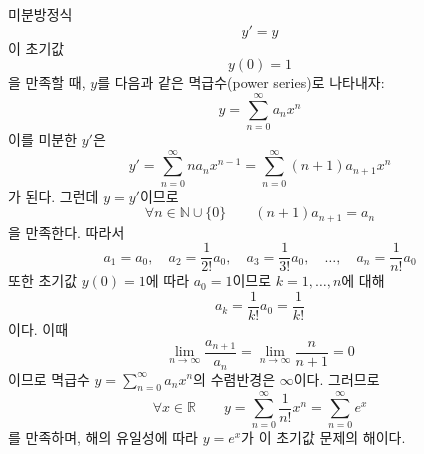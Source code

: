 \documentclass[../engineering_mathematics_lecture_note.tex]{subfiles}
\begin{document}
\begin{example}
    미분방정식
    \begin{equation*}
        y' = y
    \end{equation*}
    이 초기값
    \begin{equation*}
        y(0) = 1
    \end{equation*}
    을 만족할 때, $y$를 다음과 같은 멱급수(power series)로 나타내자:
    \begin{equation*}
        y = \sum_{n = 0}^\infty a_n x^n
    \end{equation*}
    이를 미분한 $y'$은
    \begin{equation*}
        y' = \sum_{n = 0}^\infty n a_n x^{n - 1} = \sum_{n = 0}^\infty (n + 1) a_{n + 1} x^n
    \end{equation*}
    가 된다.
    그런데 $y = y'$이므로
    \begin{equation*}
        \forall n \in \mathbb N \cup \{0\} \qquad (n + 1) a_{n + 1} = a_n
    \end{equation*}
    을 만족한다.
    따라서
    \begin{equation*}
        a_1 = a_0, \quad a_2 = \frac{1}{2!} a_0, \quad a_3 = \frac{1}{3!} a_0, \quad \dots, \quad a_n = \frac{1}{n!} a_0
    \end{equation*}
    또한 초기값 $y(0) = 1$에 따라 $a_0 = 1$이므로 $k = 1, \dots, n$에 대해
    \begin{equation*}
        a_k = \frac{1}{k!} a_0 = \frac{1}{k!}
    \end{equation*}
    이다.
    이때
    \begin{equation*}
        \lim_{n \to \infty} \frac{a_{n + 1}}{a_n} = \lim_{n \to \infty} \frac{n}{n+1} = 0
    \end{equation*}
    이므로 멱급수 $y = \sum_{n = 0}^\infty a_n x^n$의 수렴반경은 $\infty$이다.
    그러므로
    \begin{equation*}
        \forall x \in \mathbb R \qquad y = \sum_{n = 0}^\infty \frac{1}{n!} x^n = \sum^{\infty}_{n = 0} e^x
    \end{equation*}
    를 만족하며, 해의 유일성에 따라 $y = e^x$가 이 초기값 문제의 해이다.
\end{example}
\end{document}
